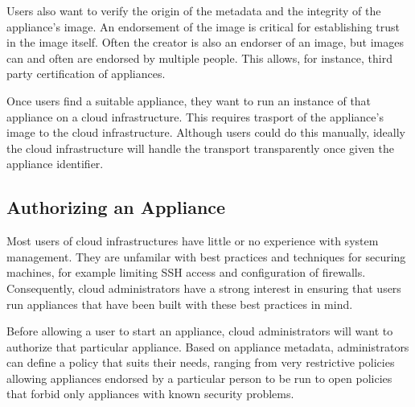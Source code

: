 Users also want to verify the origin of the metadata and the integrity
of the appliance's image.  An endorsement of the image is critical for
establishing trust in the image itself.  Often the creator is also an
endorser of an image, but images can and often are endorsed by
multiple people.  This allows, for instance, third party certification
of appliances.

Once users find a suitable appliance, they want to run an instance of
that appliance on a cloud infrastructure.  This requires trasport of
the appliance's image to the cloud infrastructure.  Although users
could do this manually, ideally the cloud infrastructure will handle
the transport transparently once given the appliance identifier.

\subsection{Authorizing an Appliance}

Most users of cloud infrastructures have little or no experience with
system management.  They are unfamilar with best practices and
techniques for securing machines, for example limiting SSH access and
configuration of firewalls.  Consequently, cloud administrators have a
strong interest in ensuring that users run appliances that have been
built with these best practices in mind.

Before allowing a user to start an appliance, cloud administrators
will want to authorize that particular appliance.  Based on appliance
metadata, administrators can define a policy that suits their needs,
ranging from very restrictive policies allowing appliances endorsed by
a particular person to be run to open policies that forbid only
appliances with known security problems.
